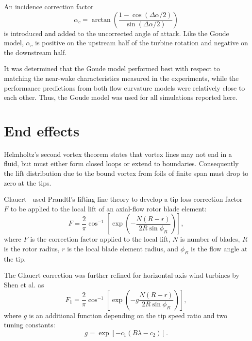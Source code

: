 An incidence correction factor
\begin{equation}
    \alpha_c = \arctan \left( \frac{1 - \cos (\Delta \alpha / 2)}{\sin (\Delta
        \alpha / 2)} \right)
    \label{eq:Mandal-Burton-alpha-corr}
\end{equation}
is introduced and added to the uncorrected angle of attack. Like the Goude
model, $\alpha_c$ is positive on the upstream half of the turbine rotation and
negative on the downstream half.

It was determined that the Goude model performed best with respect to matching
the near-wake characteristics measured in the experiments, while the performance
predictions from both flow curvature models were relatively close to each other.
Thus, the Goude model was used for all simulations reported here.


\section{End effects}

Helmholtz's second vortex theorem states that vortex lines may not end in a
fluid, but must either form closed loops or extend to boundaries. Consequently
the lift distribution due to the bound vortex from foils of finite span must
drop to zero at the tips.

Glauert~\cite{Glauert1935} used Prandtl's lifting line theory \cite{Prandtl1927}
to develop a tip loss correction factor $F$ to be applied to the local lift of
an axial-flow rotor blade element:
\begin{equation}
    F = \frac{2}{\pi} \cos^{-1} \left[ \exp \left( - \frac{N (R-r)}{2R \sin
        \phi_R} \right) \right],
\end{equation}
where $F$ is the correction factor applied to the local lift, $N$ is number of
blades, $R$ is the rotor radius, $r$ is the local blade element radius, and
$\phi_R$ is the flow angle at the tip.

The Glauert correction was further refined for horizontal-axis wind turbines by
Shen et al. \cite{Shen2005a} as
\begin{equation}
    F_1 = \frac{2}{\pi} \cos^{-1} \left[ \exp \left( -g \frac{N (R-r)}{2R \sin
    \phi_R} \right) \right],
\end{equation}
where $g$ is an additional function depending on the tip speed ratio and two
tuning constants:
\begin{equation}
    g = \exp [ -c_1 (B \lambda - c_2) ].
\end{equation}

